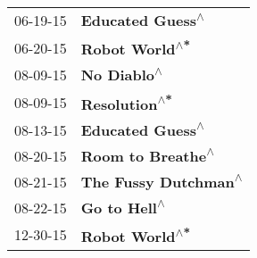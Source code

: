 \begin{supertabular}{p{0.25\columnwidth}p{0.75\columnwidth}}
 06-19-15 &            \textbf{Educated Guess\textsuperscript{$\wedge$}} \\
 06-20-15 &              \textbf{Robot World\textsuperscript{$\wedge$*}} \\
 08-09-15 &                 \textbf{No Diablo\textsuperscript{$\wedge$}} \\
 08-09-15 &               \textbf{Resolution\textsuperscript{$\wedge$*}} \\
 08-13-15 &            \textbf{Educated Guess\textsuperscript{$\wedge$}} \\
 08-20-15 &           \textbf{Room to Breathe\textsuperscript{$\wedge$}} \\
 08-21-15 &        \textbf{The Fussy Dutchman\textsuperscript{$\wedge$}} \\
 08-22-15 &                \textbf{Go to Hell\textsuperscript{$\wedge$}} \\
 12-30-15 &              \textbf{Robot World\textsuperscript{$\wedge$*}} \\
\end{supertabular}
